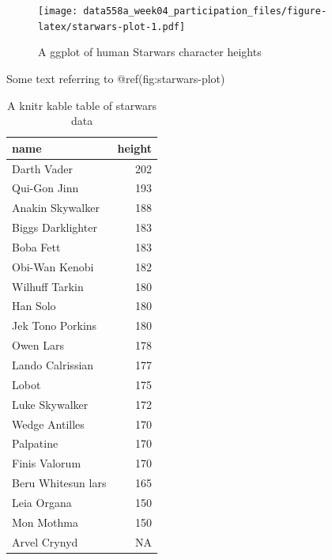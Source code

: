 \documentclass[]{article}
\newenvironment{Shaded}{\begin{snugshade}}{\end{snugshade}}
\newcommand{\KeywordTok}[1]{\textcolor[rgb]{0.13,0.29,0.53}{\textbf{#1}}}
\newcommand{\DataTypeTok}[1]{\textcolor[rgb]{0.13,0.29,0.53}{#1}}
\newcommand{\DecValTok}[1]{\textcolor[rgb]{0.00,0.00,0.81}{#1}}
\newcommand{\StringTok}[1]{\textcolor[rgb]{0.31,0.60,0.02}{#1}}
\newcommand{\OperatorTok}[1]{\textcolor[rgb]{0.81,0.36,0.00}{\textbf{#1}}}
\newcommand{\NormalTok}[1]{#1}
\begin{document}
\begin{figure}
\centering
\texttt{[image: data558a\_week04\_participation\_files/figure-latex/starwars-plot-1.pdf]}
\caption{A ggplot of human Starwars character heights}
\end{figure}

Some text referring to @ref(fig:starwars-plot)

\begin{Shaded}
\end{Shaded}

\begin{table}

\caption{\label{tab:starwars-tbl}A knitr kable table of starwars data}
\centering
\begin{tabular}[t]{l|r}
\hline
name & height\\
\hline
Darth Vader & 202\\
\hline
Qui-Gon Jinn & 193\\
\hline
Anakin Skywalker & 188\\
\hline
Biggs Darklighter & 183\\
\hline
Boba Fett & 183\\
\hline
Obi-Wan Kenobi & 182\\
\hline
Wilhuff Tarkin & 180\\
\hline
Han Solo & 180\\
\hline
Jek Tono Porkins & 180\\
\hline
Owen Lars & 178\\
\hline
Lando Calrissian & 177\\
\hline
Lobot & 175\\
\hline
Luke Skywalker & 172\\
\hline
Wedge Antilles & 170\\
\hline
Palpatine & 170\\
\hline
Finis Valorum & 170\\
\hline
Beru Whitesun lars & 165\\
\hline
Leia Organa & 150\\
\hline
Mon Mothma & 150\\
\hline
Arvel Crynyd & NA\\
\hline
\end{tabular}
\end{table}
\end{document}
